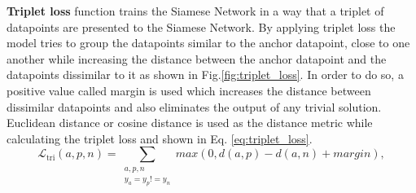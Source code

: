 \vspace{5mm}

\textbf{Triplet loss} function\cite{weinberger2009distance} trains the Siamese Network in a way that a triplet of datapoints are presented to the Siamese Network. By applying triplet loss the model tries to group the datapoints similar to the anchor datapoint, close to one another while increasing the distance between the anchor datapoint and the datapoints dissimilar to it as shown in Fig.\ref{fig:triplet_loss}. In order to do so, a positive value called margin is used which increases the distance between dissimilar datapoints and also eliminates the output of any trivial solution. Euclidean distance or cosine distance is used as the distance metric while calculating the triplet loss and shown in Eq. \ref{eq:triplet_loss}. \cite{hermans2017defense,siamese_network}
\begin{equation}
  \label{eq:triplet_loss}
  \mathcal{L}_{\textrm{tri}}(a,p,n)=\sum_{\substack{a,p,n \\ y_{a}=y_{p}!=y_{n}}} max(0,d(a,p)-d(a,n)+margin),
\end{equation}

